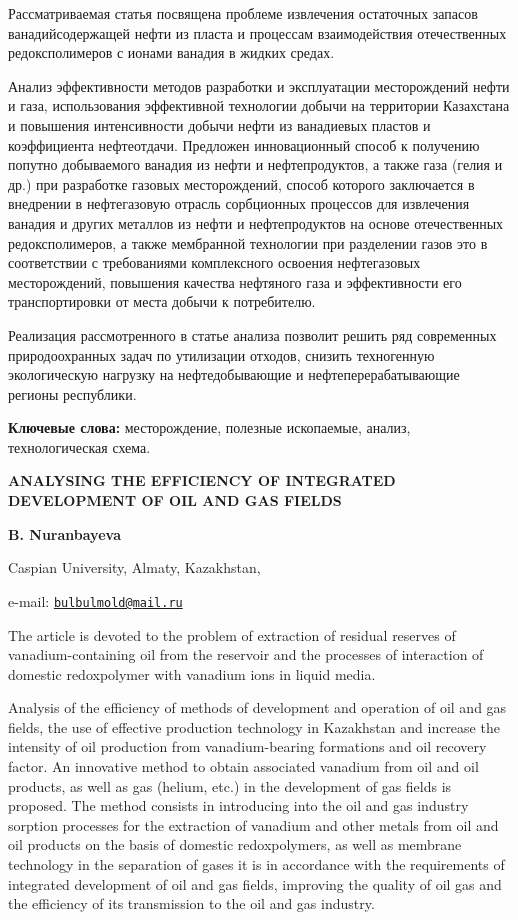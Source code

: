 Рассматриваемая статья посвящена проблеме извлечения остаточных запасов
ванадийсодержащей нефти из пласта и процессам взаимодействия
отечественных редоксполимеров с ионами ванадия в жидких средах.

Анализ эффективности методов разработки и эксплуатации месторождений
нефти и газа, использования эффективной технологии добычи на территории
Казахстана и повышения интенсивности добычи нефти из ванадиевых пластов
и коэффициента нефтеотдачи. Предложен инновационный способ к получению
попутно добываемого ванадия из нефти и нефтепродуктов, а также газа
(гелия и др.) при разработке газовых месторождений, способ которого
заключается в внедрении в нефтегазовую отрасль сорбционных процессов для
извлечения ванадия и других металлов из нефти и нефтепродуктов на основе
отечественных редоксполимеров, а также мембранной технологии при
разделении газов это в соответствии с требованиями комплексного освоения
нефтегазовых месторождений, повышения качества нефтяного газа и
эффективности его транспортировки от места добычи к потребителю.

Реализация рассмотренного в статье анализа позволит решить ряд
современных природоохранных задач по утилизации отходов, снизить
техногенную экологическую нагрузку на нефтедобывающие и
нефтеперерабатывающие регионы республики.

{\bfseries Ключевые слова:} месторождение, полезные ископаемые, анализ,
технологическая схема.
\begin{articleheader}

{\bfseries ANALYSING THE EFFICIENCY OF INTEGRATED DEVELOPMENT OF OIL AND GAS FIELDS}

{\bfseries B. Nuranbayeva}
\end{articleheader}
\begin{affiliation}

Caspian University, Almaty, Kazakhstan,

e-mail: \href{mailto:bulbulmold@mail.ru}{\nolinkurl{bulbulmold@mail.ru}}
\end{affiliation}

The article is devoted to the problem of extraction of residual reserves
of vanadium-containing oil from the reservoir and the processes of
interaction of domestic redoxpolymer with vanadium ions in liquid media.

Analysis of the efficiency of methods of development and operation of
oil and gas fields, the use of effective production technology in
Kazakhstan and increase the intensity of oil production from
vanadium-bearing formations and oil recovery factor. An innovative
method to obtain associated vanadium from oil and oil products, as well
as gas (helium, etc.) in the development of gas fields is proposed. The
method consists in introducing into the oil and gas industry sorption
processes for the extraction of vanadium and other metals from oil and
oil products on the basis of domestic redoxpolymers, as well as membrane
technology in the separation of gases it is in accordance with the
requirements of integrated development of oil and gas fields, improving
the quality of oil gas and the efficiency of its transmission to the oil
and gas industry.

